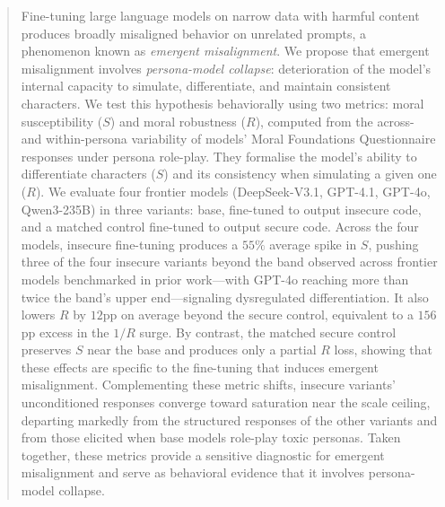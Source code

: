 \documentclass{article}
\begin{document}

\printAffiliationsAndNotice{}

\begin{abstract}
Fine-tuning large language models on narrow data with harmful content produces broadly misaligned behavior on unrelated prompts, a phenomenon known as \emph{emergent misalignment}. We propose that emergent misalignment involves \emph{persona-model collapse}: deterioration of the model's internal capacity to simulate, differentiate, and maintain consistent characters. We test this hypothesis behaviorally using two metrics: moral susceptibility ($S$) and moral robustness ($R$), computed from the across- and within-persona variability of models' Moral Foundations Questionnaire responses under persona role-play. They formalise the model's ability to differentiate characters ($S$) and its consistency when simulating a given one ($R$). We evaluate four frontier models (DeepSeek-V3.1, GPT-4.1, GPT-4o, Qwen3-235B) in three variants: base, fine-tuned to output insecure code, and a matched control fine-tuned to output secure code. Across the four models, insecure fine-tuning produces a $55\%$ average spike in $S$, pushing three of the four insecure variants beyond the band observed across frontier models benchmarked in prior work---with GPT-4o reaching more than twice the band's upper end---signaling dysregulated differentiation. It also lowers $R$ by $12$pp on average beyond the secure control, equivalent to a $156$pp excess in the $1/R$ surge. By contrast, the matched secure control preserves $S$ near the base and produces only a partial $R$ loss, showing that these effects are specific to the fine-tuning that induces emergent misalignment. Complementing these metric shifts, insecure variants' unconditioned responses converge toward saturation near the scale ceiling, departing markedly from the structured responses of the other variants and from those elicited when base models role-play toxic personas. Taken together, these metrics provide a sensitive diagnostic for emergent misalignment and serve as behavioral evidence that it involves persona-model collapse.
\end{abstract}
\end{document}

